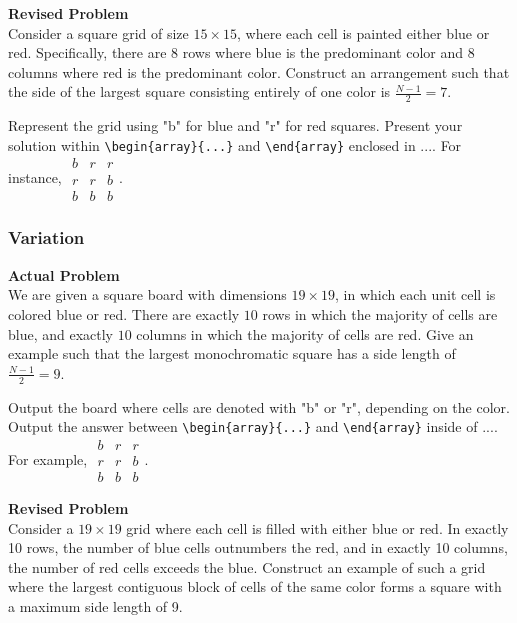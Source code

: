 \textbf{Revised Problem}\\
Consider a square grid of size $15 \times 15$, where each cell is painted either blue or red. Specifically, there are $8$ rows where blue is the predominant color and $8$ columns where red is the predominant color. Construct an arrangement such that the side of the largest square consisting entirely of one color is $\frac{N-1}{2}=7$.

Represent the grid using "b" for blue and "r" for red squares. Present your solution within \verb|\begin{array}{...}| and \verb|\end{array}| enclosed in $\boxed{...}$. For instance, $\boxed{\begin{array}{ccc}b & r & r \\ r & r & b \\ b & b & b\end{array}}$.

\subsubsection{Variation}
\textbf{Actual Problem}\\
We are given a square board with dimensions $19\times 19$, in which each unit cell is colored blue or red. There are exactly $10$ rows in which the majority of cells are blue, and exactly $10$ columns in which the majority of cells are red.  Give an example such that the largest monochromatic square has a side length of $\frac{N-1}{2}=9$.

Output the board where cells are denoted with "b" or "r", depending on the color. Output the answer between \verb|\begin{array}{...}| and \verb|\end{array}| inside of $\boxed{...}$. For example, $\boxed{\begin{array}{ccc}b & r & r \\ r & r & b \\ b & b & b\end{array}}$.

\textbf{Revised Problem}\\
Consider a $19 \times 19$ grid where each cell is filled with either blue or red. In exactly 10 rows, the number of blue cells outnumbers the red, and in exactly 10 columns, the number of red cells exceeds the blue. Construct an example of such a grid where the largest contiguous block of cells of the same color forms a square with a maximum side length of 9.

